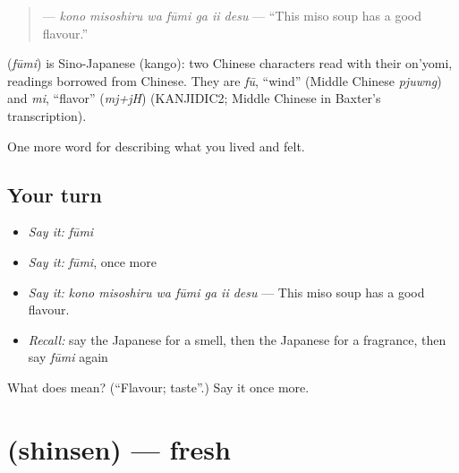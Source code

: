 \begin{quote}
\textbf{   } — \emph{kono misoshiru wa fūmi ga ii desu} — \textquotedblleft{}This miso soup has a good flavour.\textquotedblright{}
\end{quote}

\begin{cousinweb}
\textbf{} (\emph{fūmi}) is Sino-Japanese (kango): two Chinese characters read with their on'yomi, readings borrowed from Chinese. They are \emph{fū}, \textquotedblleft{}wind\textquotedblright{} (Middle Chinese \emph{pjuwng}) and \emph{mi}, \textquotedblleft{}flavor\textquotedblright{} (\emph{mj+jH}) (KANJIDIC2; Middle Chinese in Baxter's transcription).
\end{cousinweb}

\begin{grammarlens}[title={What you've built}]
One more word for describing what you lived and felt.
\end{grammarlens}

\subsection*{Your turn}
\begin{itemize}
\raggedright
  \item \emph{Say it:} \emph{fūmi}
  \item \emph{Say it:} \emph{fūmi}, once more
  \item \emph{Say it:} \emph{kono misoshiru wa fūmi ga ii desu} — This miso soup has a good flavour.
  \item \emph{Recall:} say the Japanese for a smell, then the Japanese for a fragrance, then say \emph{fūmi} again
\end{itemize}

\begin{tcolorbox}[breakable,colback=teal!4,colframe=teal!35!black,title={Before you move on}]
What does  mean? (\textquotedblleft{}Flavour; taste\textquotedblright{}.) Say it once more.
\end{tcolorbox}
\section[\texorpdfstring{\ja{しんせん} (shinsen)}{しんせん (shinsen)}]{ (shinsen) — fresh}

\label{lesson:JA-C495-shinsen}



